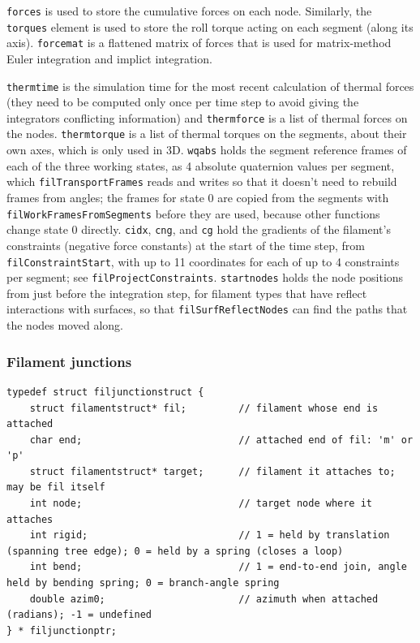 \documentclass {scrbook}
\newcommand {\ttt} {\texttt}
\begin{document}
\ttt{forces} is used to store the cumulative forces on each node. Similarly, the \ttt{torques} element is used to store the roll torque acting on each segment (along its axis). \ttt{forcemat} is a flattened matrix of forces that is used for matrix-method Euler integration and implict integration.

\ttt{thermtime} is the simulation time for the most recent calculation of thermal forces (they need to be computed only once per time step to avoid giving the integrators conflicting information) and \ttt{thermforce} is a list of thermal forces on the nodes. \ttt{thermtorque} is a list of thermal torques on the segments, about their own axes, which is only used in 3D. \ttt{wqabs} holds the segment reference frames of each of the three working states, as 4 absolute quaternion values per segment, which \ttt{filTransportFrames} reads and writes so that it doesn't need to rebuild frames from angles; the frames for state 0 are copied from the segments with \ttt{filWorkFramesFromSegments} before they are used, because other functions change state 0 directly. \ttt{cidx}, \ttt{cng}, and \ttt{cg} hold the gradients of the filament's constraints (negative force constants) at the start of the time step, from \ttt{filConstraintStart}, with up to 11 coordinates for each of up to 4 constraints per segment; see \ttt{filProjectConstraints}. \ttt{startnodes} holds the node positions from just before the integration step, for filament types that have reflect interactions with surfaces, so that \ttt{filSurfReflectNodes} can find the paths that the nodes moved along.

\subsubsection{Filament junctions}

\begin{lstlisting}
typedef struct filjunctionstruct {
    struct filamentstruct* fil;         // filament whose end is attached
    char end;                           // attached end of fil: 'm' or 'p'
    struct filamentstruct* target;      // filament it attaches to; may be fil itself
    int node;                           // target node where it attaches
    int rigid;                          // 1 = held by translation (spanning tree edge); 0 = held by a spring (closes a loop)
    int bend;                           // 1 = end-to-end join, angle held by bending spring; 0 = branch-angle spring
    double azim0;                       // azimuth when attached (radians); -1 = undefined
} * filjunctionptr;
\end{lstlisting}
\end{document}
